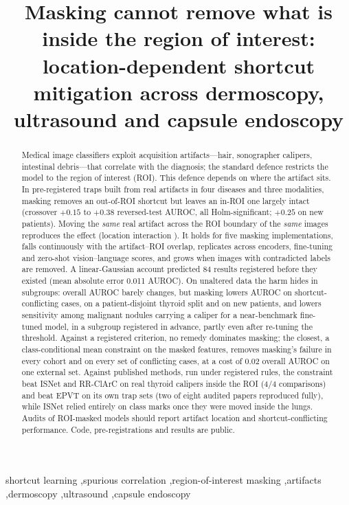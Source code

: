 \documentclass[review,3p]{elsarticle}
\begin{document}
\begin{frontmatter}
\title{Masking cannot remove what is inside the region of interest: location-dependent shortcut mitigation across dermoscopy, ultrasound and capsule endoscopy}

\begin{abstract}
Medical image classifiers exploit acquisition artifacts---hair, sonographer calipers, intestinal debris---that
correlate with the diagnosis; the standard defence restricts the model to the region of interest (ROI). This defence
depends on where the artifact sits. In pre-registered traps built from real artifacts in four diseases and three
modalities, masking removes an out-of-ROI shortcut but leaves an in-ROI one largely intact (crossover $+0.15$ to $+0.38$
reversed-test AUROC, all Holm-significant; $+0.25$ on new patients). Moving the \emph{same} real artifact across the ROI
boundary of the \emph{same} images reproduces the effect (location interaction
). It holds for five masking implementations, falls continuously with the
artifact--ROI overlap, replicates across encoders, fine-tuning and zero-shot vision--language scores, and grows when
images with contradicted labels are removed. A linear-Gaussian account predicted 84 results registered before they
existed (mean absolute error 0.011 AUROC). On unaltered data the harm hides in subgroups: overall AUROC barely changes,
but masking lowers AUROC on shortcut-conflicting cases, on a patient-disjoint thyroid split and on new patients, and
lowers sensitivity among malignant nodules carrying a caliper for a near-benchmark fine-tuned model, in a subgroup
registered in advance, partly even after re-tuning the threshold. Against a registered criterion, no remedy dominates
masking; the closest, a class-conditional mean constraint on the masked features, removes masking's failure in every
cohort and on every set of conflicting cases, at a cost of 0.02 overall AUROC on one external set. Against published methods, run under registered rules, the
constraint beat ISNet and RR-ClArC on real thyroid calipers inside the ROI (4/4 comparisons) and beat EPVT on its own
trap sets (two of eight audited papers reproduced fully), while ISNet relied entirely on class marks once they were moved inside the lungs. Audits of ROI-masked
models should report artifact location and shortcut-conflicting performance. Code, pre-registrations and results are
public.
\end{abstract}

\begin{keyword}
shortcut learning \sep spurious correlation \sep region-of-interest masking \sep artifacts \sep dermoscopy \sep ultrasound \sep capsule endoscopy
\end{keyword}
\end{frontmatter}
\end{document}
